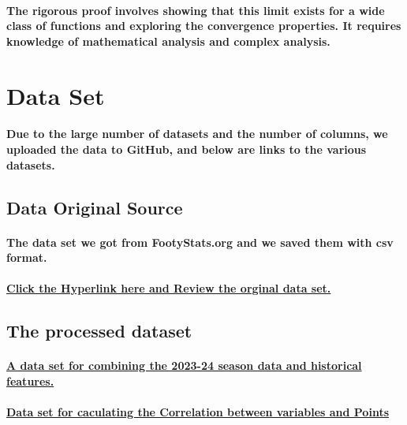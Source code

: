 \paragraph{The rigorous proof involves showing that this limit exists for a wide class of functions and exploring the convergence properties. It requires knowledge of mathematical analysis and complex analysis.}
% 
% 
% 
% 
% 
% 
\section{Data Set}
\paragraph{Due to the large number of datasets and the number of columns, we uploaded the data to GitHub, and below are links to the various datasets.}
\subsection{Data Original Source}
\paragraph{The data set we got from FootyStats.org and we saved them with csv format.}
\paragraph{\href{https://github.com/QianZeHao123/IMDS/tree/main/notes_and_assignments/group-project/src/Data}{Click the Hyperlink here and Review the orginal data set.}}
% 
% 
% 
\subsection{The processed dataset}
\paragraph{\href{https://github.com/QianZeHao123/IMDS/blob/main/notes_and_assignments/group-project/src/Results/2023_24_General.csv}{A data set for combining the 2023-24 season data and historical features.}}
% 
% 
\paragraph{\href{https://github.com/QianZeHao123/IMDS/blob/main/notes_and_assignments/group-project/src/Results/2023_24_Processed.csv}{Data set for caculating the Correlation between variables and Points}}
% 
% 
